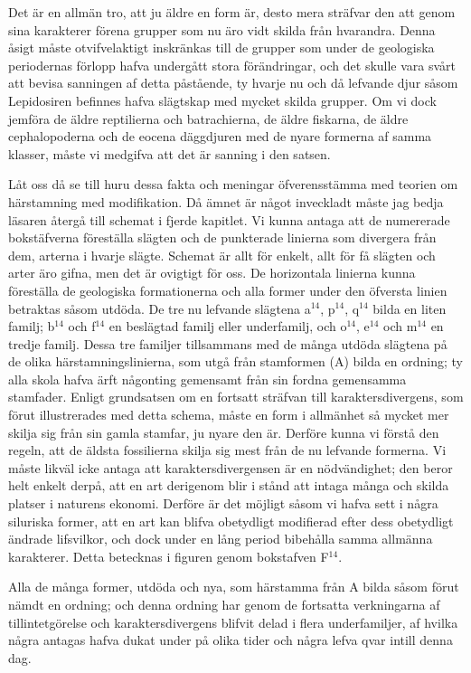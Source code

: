 Det är en allmän tro, att ju äldre en form är, desto mera sträfvar den att genom sina karakterer förena grupper som nu äro vidt skilda från hvarandra. Denna åsigt måste otvifvelaktigt inskränkas till de grupper som under de geologiska periodernas förlopp hafva undergått stora förändringar, och det skulle vara svårt att bevisa sanningen af detta påstående, ty hvarje nu och då lefvande djur såsom Lepidosiren befinnes hafva slägtskap med mycket skilda grupper. Om vi dock jemföra de äldre reptilierna och batrachierna, de äldre fiskarna, de äldre cephalopoderna och de eocena däggdjuren med de nyare formerna af samma klasser, måste vi medgifva att det är sanning i den satsen.

Låt oss då se till huru dessa fakta och meningar öfverensstämma med teorien om härstamning med modifikation. Då ämnet är något inveckladt måste jag bedja läsaren återgå till schemat i fjerde kapitlet. Vi kunna antaga att de numererade bokstäfverna föreställa slägten och de punkterade linierna som divergera från dem, arterna i hvarje slägte. Schemat är allt för enkelt, allt för få slägten och arter äro gifna, men det är ovigtigt för oss. De horizontala linierna kunna föreställa de geologiska formationerna och alla former under den öfversta linien betraktas såsom utdöda. De tre nu lefvande slägtena a${}^{14}$, p${}^{14}$, q${}^{14}$ bilda en liten familj; b${}^{14}$ och f${}^{14}$ en beslägtad familj eller underfamilj, och o${}^{14}$, e${}^{14}$ och m${}^{14}$ en tredje familj. Dessa tre familjer tillsammans med de många utdöda slägtena på de olika härstamningslinierna, som utgå från stamformen (A) bilda en ordning; ty alla skola hafva ärft någonting gemensamt från sin fordna gemensamma stamfader. Enligt grundsatsen om en fortsatt sträfvan till karaktersdivergens, som förut illustrerades med detta schema, måste en form i allmänhet så mycket mer skilja sig från sin gamla stamfar, ju nyare den är. Derföre kunna vi förstå den regeln, att de äldsta fossilierna skilja sig mest från de nu lefvande formerna. Vi måste likväl icke antaga att karaktersdivergensen är en nödvändighet; den beror helt enkelt derpå, att en art derigenom blir i stånd att intaga många och skilda platser i naturens ekonomi. Derföre är det möjligt såsom vi hafva sett i några siluriska former, att en art kan blifva obetydligt modifierad efter dess obetydligt ändrade lifsvilkor, och dock under en lång period bibehålla samma allmänna karakterer. Detta betecknas i figuren genom bokstafven F${}^{14}$.

Alla de många former, utdöda och nya, som härstamma från A bilda såsom förut nämdt en ordning; och denna ordning har genom de fortsatta verkningarna af tillintetgörelse och karaktersdivergens blifvit delad i flera underfamiljer, af hvilka några antagas hafva dukat under på olika tider och några lefva qvar intill denna dag.

